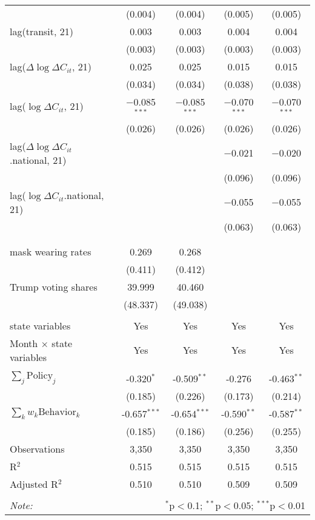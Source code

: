 \begin{tabular}{@{\extracolsep{1pt}}lcccc}
  & (0.004) & (0.004) & (0.005) & (0.005) \\ 
  lag(transit, 21) & 0.003 & 0.003 & 0.004 & 0.004 \\ 
  & (0.003) & (0.003) & (0.003) & (0.003) \\ 
  lag($\Delta \log \Delta C_{it}$, 21) & 0.025 & 0.025 & 0.015 & 0.015 \\ 
  & (0.034) & (0.034) & (0.038) & (0.038) \\ 
  lag($\log \Delta C_{it}$, 21) & $-$0.085$^{***}$ & $-$0.085$^{***}$ & $-$0.070$^{***}$ & $-$0.070$^{***}$ \\ 
  & (0.026) & (0.026) & (0.026) & (0.026) \\ 
  lag($\Delta \log \Delta C_{it}$.national, 21) &  &  & $-$0.021 & $-$0.020 \\ 
  &  &  & (0.096) & (0.096) \\ 
  lag($\log \Delta C_{it}$.national, 21) &  &  & $-$0.055 & $-$0.055 \\ 
  &  &  & (0.063) & (0.063) \\ 
   &  &  &  &  \\ 
  &  &  &  &  \\ 
  mask wearing rates & 0.269 & 0.268 &  &  \\ 
  & (0.411) & (0.412) &  &  \\ 
  Trump voting shares & 39.999 & 40.460 &  &  \\ 
  & (48.337) & (49.038) &  &  \\ 
 \hline \\[-1.8ex] 
state variables & Yes & Yes & Yes & Yes \\ 
Month $\times$ state variables & Yes & Yes & Yes & Yes \\ 
\hline \\[-1.8ex] 
$\sum_j \mathrm{Policy}_j$ & -0.320$^{*}$ & -0.509$^{**}$ & -0.276 & -0.463$^{**}$ \\ 
 & (0.185) & (0.226) & (0.173) & (0.214) \\ 
$\sum_k w_k \mathrm{Behavior}_k$ & -0.657$^{***}$ & -0.654$^{***}$ & -0.590$^{**}$ & -0.587$^{**}$ \\ 
 & (0.185) & (0.186) & (0.256) & (0.255) \\ 
Observations & 3,350 & 3,350 & 3,350 & 3,350 \\ 
R$^{2}$ & 0.515 & 0.515 & 0.515 & 0.515 \\ 
Adjusted R$^{2}$ & 0.510 & 0.510 & 0.509 & 0.509 \\ 
\hline 
\hline \\[-1.8ex] 
\textit{Note:}  & \multicolumn{4}{r}{$^{*}$p$<$0.1; $^{**}$p$<$0.05; $^{***}$p$<$0.01} \\ 
\end{tabular} 